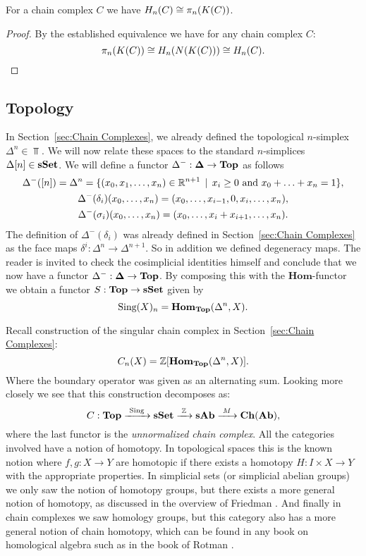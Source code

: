 \begin{corollary}
	For a chain complex $C$ we have $H_n(C) \cong \pi_n(K(C))$.
\end{corollary}
\begin{proof}
	By the established equivalence we have for any chain complex $C$:
	$$ \pi_n(K(C)) \cong H_n(N(K(C))) \cong H_n(C). $$
\end{proof}

\subsection{Topology}
In Section~\ref{sec:Chain Complexes}, we already defined the topological $n$-simplex $\Delta^n \in \Top$. We will now relate these spaces to the standard $n$-simplices $\Delta[n] \in \mathbf{sSet}$. We will define a functor $\Delta^-: \mathbf{\Delta} \to \mathbf{Top}$ as follows
\begin{gather*}
	\Delta^-([n]) = \Delta^n = \{(x_0, x_1, \ldots, x_n) \in \mathbb{R}^{n+1} \,\mid\, x_i \geq 0 \text{ and } x_0 + \ldots + x_n = 1 \}, \\
	\Delta^-(\delta_i) (x_0, \ldots, x_n) = (x_0, \ldots, x_{i-1}, 0, x_{i}, \ldots, x_n), \\
	\Delta^-(\sigma_i) (x_0, \ldots, x_n) = (x_0, \ldots, x_{i} + x_{i+1}, \ldots, x_n).
\end{gather*}
The definition of $\Delta^-(\delta_i)$ was already defined in Section~\ref{sec:Chain Complexes} as the face maps $\delta^i: \Delta^n \to \Delta^{n+1}$. So in addition we defined degeneracy maps. The reader is invited to check the cosimplicial identities himself and conclude that we now have a functor $\Delta^-: \mathbf{\Delta} \to \mathbf{Top}$. By composing this with the $\mathbf{Hom}$-functor we obtain a functor $S: \mathbf{Top} \to \mathbf{sSet}$ given by
$$ \text{Sing}(X)_n = \mathbf{Hom}_{\mathbf{Top}}(\Delta^n, X). $$

Recall construction of the singular chain complex in Section~\ref{sec:Chain Complexes}:
$$ C_n(X) = \mathbb{Z}[\mathbf{Hom}_{\mathbf{Top}}(\Delta^n, X)]. $$
Where the boundary operator was given as an alternating sum. Looking more closely we see that this construction decomposes as:
$$ C: \mathbf{Top} \xrightarrow{\,\,{\text{Sing}}\,\,} \mathbf{sSet} \xrightarrow{\,\,{\mathbb{Z}}\,\,} \mathbf{sAb} \xrightarrow{\,\,{M}\,\,} \mathbf{Ch}(\mathbf{Ab}), $$
where the last functor is the \emph{unnormalized chain complex}. All the categories involved have a notion of homotopy. In topological spaces this is the known notion where $f, g:X \to Y$ are homotopic if there exists a homotopy $H:I \times X \to Y$ with the appropriate properties. In simplicial sets (or simplicial abelian groups) we only saw the notion of homotopy groups, but there exists a more general notion of homotopy, as discussed in the overview of Friedman \cite{friedman}. And finally in chain complexes we saw homology groups, but this category also has a more general notion of chain homotopy, which can be found in any book on homological algebra such as in the book of Rotman \cite{rotman}.

